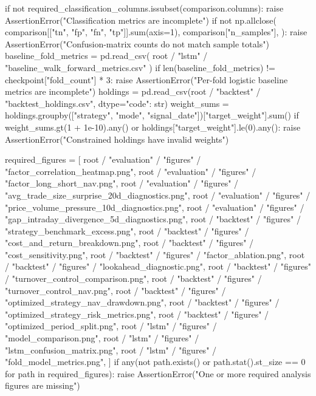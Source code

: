 \documentclass[UTF8,a4paper,fontset=fandol]{ctexart}
\begin{document}
\begin{ProjectCode}
{    }
    if not required_classification_columns.issubset(comparison.columns):
        raise AssertionError("Classification metrics are incomplete")
    if not np.allclose(
        comparison[["tn", "fp", "fn", "tp"]].sum(axis=1),
        comparison["n_samples"],
    ):
        raise AssertionError("Confusion-matrix counts do not match sample totals")
    baseline_fold_metrics = pd.read_csv(
        root / "lstm" / "baseline_walk_forward_metrics.csv"
    )
    if len(baseline_fold_metrics) != checkpoint["fold_count"] * 3:
        raise AssertionError("Per-fold logistic baseline metrics are incomplete")
    holdings = pd.read_csv(root / "backtest" / "backtest_holdings.csv", dtype={"code": str})
    weight_sums = holdings.groupby(["strategy", "mode", "signal_date"])["target_weight"].sum()
    if weight_sums.gt(1 + 1e-10).any() or holdings["target_weight"].le(0).any():
        raise AssertionError("Constrained holdings have invalid weights")

    required_figures = [
        root / "evaluation" / "figures" / "factor_correlation_heatmap.png",
        root / "evaluation" / "figures" / "factor_long_short_nav.png",
        root / "evaluation" / "figures" / "avg_trade_size_surprise_20d_diagnostics.png",
        root / "evaluation" / "figures" / "price_volume_pressure_10d_diagnostics.png",
        root / "evaluation" / "figures" / "gap_intraday_divergence_5d_diagnostics.png",
        root / "backtest" / "figures" / "strategy_benchmark_excess.png",
        root / "backtest" / "figures" / "cost_and_return_breakdown.png",
        root / "backtest" / "figures" / "cost_sensitivity.png",
        root / "backtest" / "figures" / "factor_ablation.png",
        root / "backtest" / "figures" / "lookahead_diagnostic.png",
        root / "backtest" / "figures" / "turnover_control_comparison.png",
        root / "backtest" / "figures" / "turnover_control_nav.png",
        root / "backtest" / "figures" / "optimized_strategy_nav_drawdown.png",
        root / "backtest" / "figures" / "optimized_strategy_risk_metrics.png",
        root / "backtest" / "figures" / "optimized_period_split.png",
        root / "lstm" / "figures" / "model_comparison.png",
        root / "lstm" / "figures" / "lstm_confusion_matrix.png",
        root / "lstm" / "figures" / "fold_model_metrics.png",
    ]
    if any(not path.exists() or path.stat().st_size == 0 for path in required_figures):
        raise AssertionError("One or more required analysis figures are missing")


\end{ProjectCode}
\end{document}
